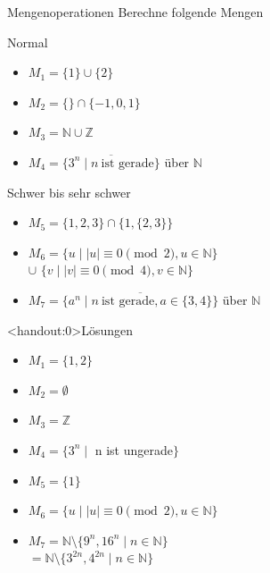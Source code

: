 {
\begin{frame}{Mengenoperationen}
    Berechne folgende Mengen
    \begin{alertblock}{Normal}
        \begin{itemize}
            \item $M_1 = \{1\}\cup \{2\}$
            \item $M_2 = \{\} \cap \{-1, 0, 1\}$
            \item $M_3 = \mathbb{N} \cup \mathbb{Z}$
            \item $M_4 = \overline{\{3^{n}\mid n \ \text{ist gerade}\} }$ über $\mathbb{N}$
        \end{itemize}
    \end{alertblock}
    \begin{alertblock}{Schwer bis sehr schwer}
        \begin{itemize}
            \item $M_5 = \{1, 2, 3\} \cap  \{1, \{2, 3\}\}$
            \item $M_6 = \{u \mid |u| \equiv 0 \pmod 2, u \in \mathbb{N}\}$\\\hspace{0.65cm}$\cup$ $\{v \mid |v| \equiv 0 \pmod 4, v \in \mathbb{N}\}$
            \item $M_7 = \overline{\{a^{n} \mid n \ \text{ist gerade}, a \in \{3,4\}\}}$ über $\mathbb{N}$
        \end{itemize}
    \end{alertblock}
\end{frame}

\begin{frame}<handout:0>{Lösungen}
    \begin{itemize}[<+- | alert@+>]
        \item
              $M_1 = \{1, 2\}$
        \item
              $M_2 = \emptyset$
        \item
              $M_3 = \mathbb{Z}$
        \item
              $M_4 = \{3^{n} \mid$ n ist ungerade$\}$
        \item
              $M_5 = \{1\}$
        \item
              $M_6 = \{u \mid |u| \equiv 0 \pmod 2, u \in \mathbb{N}\}$
        \item
              $M_7 = \mathbb{N} \setminus \{9^n, 16^n \mid n \in \mathbb N\}$\\
              \hspace{0.44cm}$ = \mathbb{N} \setminus \{3^{2n}, 4^{2n} \mid n \in \mathbb N\}$
    \end{itemize}
\end{frame}
}
